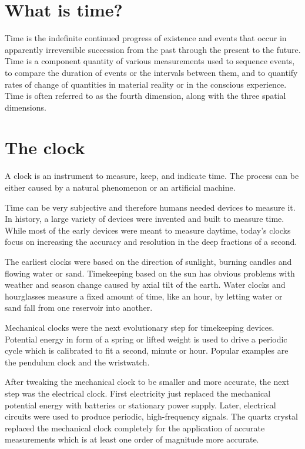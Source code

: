 \section{What is time?}

Time is the indefinite continued progress of existence and events that occur in apparently irreversible succession from the past through the present to the future.
Time is a component quantity of various measurements used to sequence events, to compare the duration of events or the intervals between them, and to quantify rates of change of quantities in material reality or in the conscious experience.
Time is often referred to as the fourth dimension, along with the three spatial dimensions.

\section{The clock}

A clock is an instrument to measure, keep, and indicate time. The process can be either caused by a natural phenomenon or an artificial machine.

Time can be very subjective and therefore humans needed devices to measure it. In history, a large variety of devices were invented and built to measure time. While most of the early devices were meant to measure daytime, today’s clocks focus on increasing the accuracy and resolution in the deep fractions of a second.

The earliest clocks were based on the direction of sunlight, burning candles and flowing water or sand. Timekeeping based on the sun has obvious problems with weather and season change caused by axial tilt of the earth. Water clocks and hourglasses measure a fixed amount of time, like an hour, by letting water or sand fall from one reservoir into another.

Mechanical clocks were the next evolutionary step for timekeeping devices. Potential energy in form of a spring or lifted weight is used to drive a periodic cycle which is calibrated to fit a second, minute or hour. Popular examples are the pendulum clock and the wristwatch.

After tweaking the mechanical clock to be smaller and more accurate, the next step was the electrical clock. First electricity just replaced the mechanical potential energy with batteries or stationary power supply. Later, electrical circuits were used to produce periodic, high-frequency signals. The quartz crystal replaced the mechanical clock completely for the application of accurate measurements which is at least one order of magnitude more accurate.

